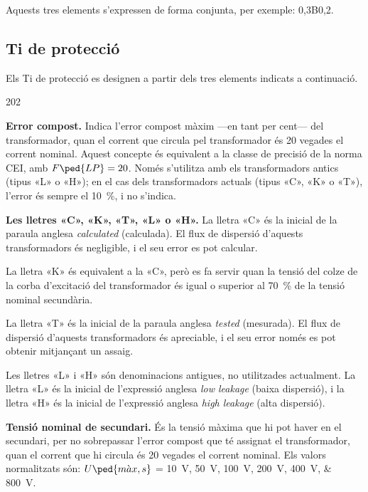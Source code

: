 Aquests tres elements s'expressen de forma conjunta, per exemple:
0,3B0,2.

\subsection{Ti de protecció}\label{sec:Ti-prot-IEEE}

Els Ti de protecció es designen a
partir dels tres elements indicats a continuació.

\begin{dingautolist}{202}
    \item \textbf{Error compost.} Indica l'error compost màxim ---en tant per cent--- del
    transformador, quan el corrent que circula pel
    transformador és 20 vegades el corrent nominal. Aquest concepte
     és equivalent a la classe de precisió de la norma CEI,
     amb $F\ped{LP}=20$. Només s'utilitza amb els transformadors antics (tipus «L» o «H»); en el cas dels transformadors actuals
     (tipus «C», «K» o «T»), l'error és sempre el \qty{10}{\percent}, i no s'indica.

    \item \textbf{Les lletres «C», «K», «T», «L» o «H».} La lletra «C» és la inicial de la
    paraula  anglesa \textit{calculated} (calculada). El flux de dispersió d'aquests transformadors és negligible, i el seu error es pot calcular.

    La lletra «K» és equivalent a la «C», però es fa servir quan la tensió del colze de la corba d'excitació del transformador és igual o superior al \qty{70}{\percent}
    de la tensió nominal secundària.

    La lletra «T» és la inicial de la   paraula  anglesa \textit{tested} (mesurada). El flux de dispersió d'aquests transformadors és apreciable, i el seu error només es pot obtenir mitjançant un assaig.

    Les lletres «L» i «H» són denominacions antigues,  no utilitzades actualment. La lletra «L» és la inicial de l'expressió anglesa \textit{low leakage} (baixa
    dispersió), i la lletra «H» és la inicial de l'expressió anglesa \textit{high leakage} (alta dispersió).  
 
    \item \textbf{Tensió nominal de secundari.} És la tensió màxima
    que hi pot haver en el secundari, per no sobrepassar l'error compost que té
    assignat el transformador, quan el corrent que hi circula
     és 20 vegades el corrent nominal. Els valors
    normalitzats són: $U\ped{m\grave{a}x,s}$ = \qtylist{10; 50; 100; 200; 400; 800}{V}.


\end{dingautolist}
